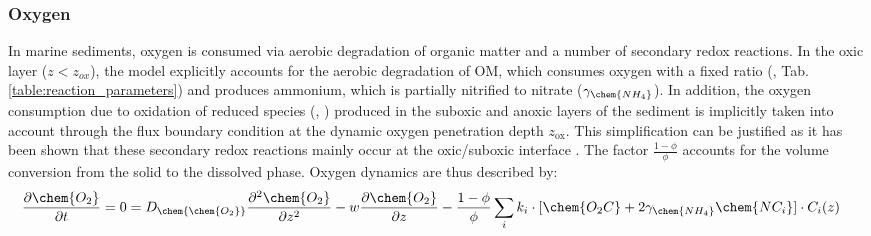 \documentclass[gmd, manuscript]{copernicus}
\begin{document}
\subsubsection{Oxygen}
In marine sediments, oxygen is consumed via aerobic degradation of organic matter and a number of secondary redox reactions. 
In the oxic layer ($z<z_{ox}$), the model explicitly accounts for the aerobic degradation of OM, which consumes oxygen with a fixed  ratio (, Tab. \ref{table:reaction_parameters}) 
and produces ammonium, which is partially nitrified to nitrate ($\gamma_\chem{NH_4}$).
In addition, the oxygen consumption due to oxidation of reduced species (, ) produced in the suboxic and anoxic layers of the sediment is implicitly taken into account 
through the flux boundary condition at the dynamic oxygen penetration depth $z_{\mathrm{ox}}$. This simplification can be justified as it has been shown that these secondary redox reactions mainly occur at the oxic/suboxic 
interface \citep{soetaert_model_1996}. The factor $\frac{1-\phi}{\phi}$ accounts for the volume conversion from the solid to the dissolved phase. 
Oxygen dynamics are thus described by:
\begin{align} 
 \frac{\partial \chem{O_2}}{\partial t} &= 0= D_{\chem{ \chem{O_2}}}\frac{\partial^2  \chem{O_2} }{\partial z^2} - w\frac{\partial  \chem{O_2}}{\partial z} - \frac{1-\phi}{\phi}\sum_i k_i \cdot [ \chem{O_2C} + 2 \gamma_{\chem{NH_4}} \chem{NC_i} ]\cdot C_{i}(z) \label{eq:ODE_O2_1}
\end{align}
\end{document}
